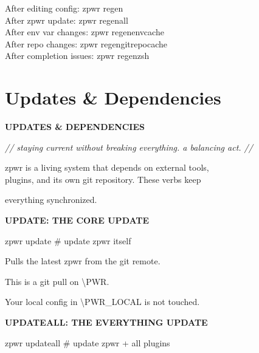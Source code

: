 \documentclass[11pt,a4paper,twoside]{book}
\begin{document}
\begin{codebox}
After editing config:     zpwr regen\\
After zpwr update:        zpwr regenall\\
After env var changes:    zpwr regenenvcache\\
After repo changes:       zpwr regengitrepocache\\
After completion issues:  zpwr regenzsh\\
\end{codebox}


\vspace{16pt}

\section{Updates \& Dependencies}


\vspace{10pt}
{\large\bfseries\color{neoncyan} UPDATES \& DEPENDENCIES}\vspace{6pt}

{\small\itshape\color{dimtext} // staying current without breaking everything. a balancing act. //}

\begin{codebox}
zpwr is a living system that depends on external tools,\\
plugins, and its own git repository. These verbs keep\\
\end{codebox}

everything synchronized.


\vspace{12pt}
{\bfseries\color{neonyellow} UPDATE: THE CORE UPDATE}\vspace{4pt}

\begin{codebox}
zpwr update                         \# update zpwr itself\\
\end{codebox}

Pulls the latest zpwr from the git remote.

This is a git pull on \textbackslash{}PWR.

Your local config in \textbackslash{}PWR\_LOCAL is not touched.


\vspace{12pt}
{\bfseries\color{neonyellow} UPDATEALL: THE EVERYTHING UPDATE}\vspace{4pt}

\begin{codebox}
zpwr updateall                      \# update zpwr + all plugins\\
\end{codebox}
\end{document}

